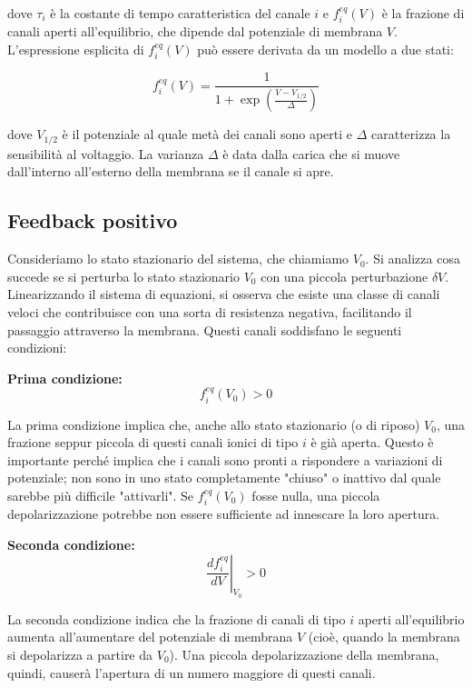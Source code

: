 dove $\tau_i$ è la costante di tempo caratteristica del canale $i$ e $f_i^{eq}(V)$ è la frazione di canali aperti all'equilibrio, che dipende dal potenziale di membrana $V$.
L'espressione esplicita di $f_i^{eq}(V)$ può essere derivata da un modello a due stati:

\begin{equation} \label{eq:ch21_3}
f_i^{eq}(V) = \frac{1}{1 + \exp\left(\frac{V-V_{1/2}}{\Delta}\right)}
\end{equation}

dove $V_{1/2}$ è il potenziale al quale metà dei canali sono aperti e $\Delta$ caratterizza la sensibilità al voltaggio. La varianza $\Delta$ è data dalla carica che si muove dall'interno all'esterno della membrana se il canale si apre.

\subsection*{Feedback positivo}
Consideriamo lo stato stazionario del sistema, che chiamiamo $V_0$. Si analizza cosa succede se si perturba lo stato stazionario $V_0$ con una piccola perturbazione $\delta V$.
Linearizzando il sistema di equazioni, si osserva che esiste una classe di canali veloci che contribuisce con una sorta di resistenza negativa, facilitando il passaggio attraverso la membrana.
Questi canali soddisfano le seguenti condizioni:

\textbf{Prima condizione:}
\begin{equation} \label{eq:ch21_4}
f_i^{eq}(V_0) > 0 
\end{equation}

La prima condizione implica che, anche allo stato stazionario (o di riposo) $V_0$, una frazione seppur piccola di questi canali ionici di tipo $i$ è già aperta. Questo è importante perché implica che i canali sono pronti a rispondere a variazioni di potenziale; non sono in uno stato completamente "chiuso" o inattivo dal quale sarebbe più difficile "attivarli". Se $f_i^{eq}(V_0)$ fosse nulla, una piccola depolarizzazione potrebbe non essere sufficiente ad innescare la loro apertura.

\textbf{Seconda condizione:}
\begin{equation} \label{eq:ch21_5}
\left. \frac{df_i^{eq}}{dV}\right|_{V_0} > 0 
\end{equation}

La seconda condizione indica che la frazione di canali di tipo $i$ aperti all'equilibrio aumenta all'aumentare del potenziale di membrana $V$ (cioè, quando la membrana si depolarizza a partire da $V_0$). Una piccola depolarizzazione della membrana, quindi, causerà l'apertura di un numero maggiore di questi canali.

